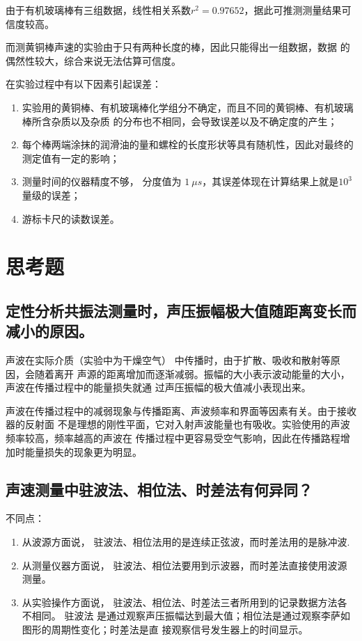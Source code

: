 \documentclass{article}
\begin{document}
由于有机玻璃棒有三组数据，线性相关系数$r^2=0.97652$，据此可推测测量结果可信度较高。

而测黄铜棒声速的实验由于只有两种长度的棒，因此只能得出一组数据，数据
的偶然性较大，综合来说无法估算可信度。

在实验过程中有以下因素引起误差：
\begin{enumerate}
    \item 实验用的黄铜棒、有机玻璃棒化学组分不确定，而且不同的黄铜棒、有机玻璃棒所含杂质以及杂质
    的分布也不相同，会导致误差以及不确定度的产生；
    \item 每个棒两端涂抹的润滑油的量和螺栓的长度形状等具有随机性，因此对最终的测定值有一定的影响；
    \item 测量时间的仪器精度不够， 分度值为 $\SI{1}{\mu s}$，其误差体现在计算结果上就是$10^3$量级的误差；
    \item  游标卡尺的读数误差。
\end{enumerate}




\section*{思考题}
\subsection*{定性分析共振法测量时，声压振幅极大值随距离变长而减小的原因。}
声波在实际介质（实验中为干燥空气） 中传播时，由于扩散、吸收和散射等原因，会随着离开
声源的距离增加而逐渐减弱。振幅的大小表示波动能量的大小，声波在传播过程中的能量损失就通
过声压振幅的极大值减小表现出来。

声波在传播过程中的减弱现象与传播距离、声波频率和界面等因素有关。由于接收器的反射面
不是理想的刚性平面，它对入射声波能量也有吸收。实验使用的声波频率较高，频率越高的声波在
传播过程中更容易受空气影响，因此在传播路程增加时能量损失的现象更为明显。
\subsection*{声速测量中驻波法、相位法、时差法有何异同？}
不同点：
\begin{enumerate}
    \item 从波源方面说， 驻波法、相位法用的是连续正弦波，而时差法用的是脉冲波.
    \item 从测量仪器方面说， 驻波法、相位法要用到示波器，而时差法直接使用波源测量。
    \item 从实验操作方面说， 驻波法、相位法、时差法三者所用到的记录数据方法各不相同。 驻波法
    是通过观察声压振幅达到最大值；相位法是通过观察李萨如图形的周期性变化；时差法是直
    接观察信号发生器上的时间显示。
\end{enumerate}
\end{document}

